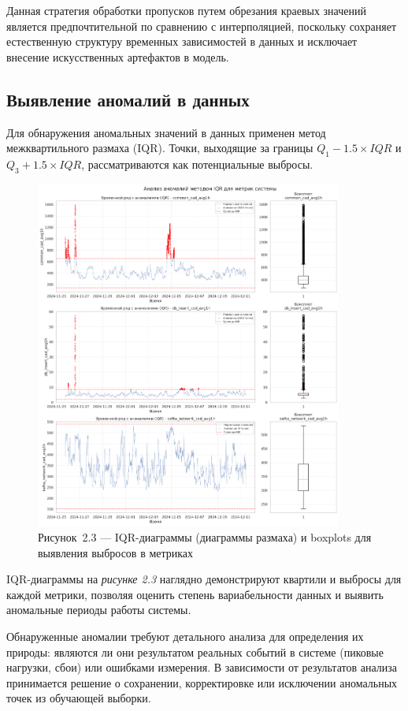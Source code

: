 Данная стратегия обработки пропусков путем обрезания краевых значений является предпочтительной по сравнению с интерполяцией, поскольку сохраняет естественную структуру временных зависимостей в данных и исключает внесение искусственных артефактов в модель.

\subsection{Выявление аномалий в данных}

Для обнаружения аномальных значений в данных применен метод межквартильного размаха (IQR). Точки, выходящие за границы $Q_1 - 1.5 \times IQR$ и $Q_3 + 1.5 \times IQR$, рассматриваются как потенциальные выбросы.

\begin{figure}[H]
	\centering
	\includegraphics[width=0.9\textwidth]{figures/chapter2/outliers_boxplot.png}
	\caption*{Рисунок~2.3 --- IQR-диаграммы (диаграммы размаха) и boxplots для выявления выбросов в метриках}
	\label{fig:outliers_analysis}
\end{figure}

IQR-диаграммы на \textit{рисунке 2.3} наглядно демонстрируют квартили и выбросы для каждой метрики, позволяя оценить степень вариабельности данных и выявить аномальные периоды работы системы.

Обнаруженные аномалии требуют детального анализа для определения их природы: являются ли они результатом реальных событий в системе (пиковые нагрузки, сбои) или ошибками измерения. В зависимости от результатов анализа принимается решение о сохранении, корректировке или исключении аномальных точек из обучающей выборки. 